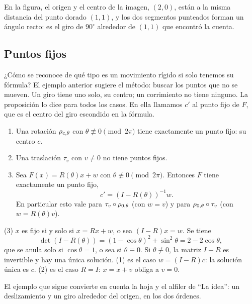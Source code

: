 En la figura, el origen y el centro de la imagen, \((2,0)\), están a la misma distancia del
punto dorado \((1,1)\), y los dos segmentos punteados forman un ángulo recto: es el giro de
\(90^\circ\) alrededor de \((1,1)\) que encontró la cuenta.

\subsection{Puntos fijos}\label{sec:puntos-fijos}

¿Cómo se reconoce de qué tipo es un movimiento rígido si solo tenemos su fórmula? El ejemplo
anterior sugiere el método: buscar los puntos que no se mueven. Un giro tiene uno solo, su
centro; un corrimiento no tiene ninguno. La proposición lo dice para todos los casos. En ella
llamamos \(c'\) al punto fijo de \(F\), que es el centro del giro escondido en la fórmula.

\begin{proposicion}\label{prop:puntos-fijos}
\begin{enumerate}
  \item Una rotación \(\rho_{c,\theta}\) con \(\theta\not\equiv0\pmod{2\pi}\) tiene exactamente un
  punto fijo: su centro \(c\).
  \item Una traslación \(\tau_v\) con \(v\neq0\) no tiene puntos fijos.
  \item Sea \(F(x)=R(\theta)x+w\) con \(\theta\not\equiv0\pmod{2\pi}\). Entonces \(F\) tiene
  exactamente un punto fijo,
  \[
  c'=(I-R(\theta))^{-1}w .
  \]
  En particular esto vale para \(\tau_v\circ\rho_{0,\theta}\) (con \(w=v\)) y para
  \(\rho_{0,\theta}\circ\tau_v\) (con \(w=R(\theta)v\)).
\end{enumerate}
\end{proposicion}

\begin{demostracion}
(3) \(x\) es fijo si y solo si \(x=R x+w\), o sea \((I-R)x=w\). Se tiene
\[
\det(I-R(\theta))=(1-\cos\theta)^2+\sin^2\theta=2-2\cos\theta,
\]
que se anula solo si \(\cos\theta=1\), o sea si \(\theta\equiv0\). Si \(\theta\not\equiv0\), la
matriz \(I-R\) es invertible y hay una única solución. (1) es el caso
\(w=(I-R)c\): la solución única es \(c\). (2) es el caso \(R=I\): \(x=x+v\) obliga a \(v=0\).
\end{demostracion}

El ejemplo que sigue convierte en cuenta la hoja y el alfiler de \enquote{La idea}: un
deslizamiento y un giro alrededor del origen, en los dos órdenes.

